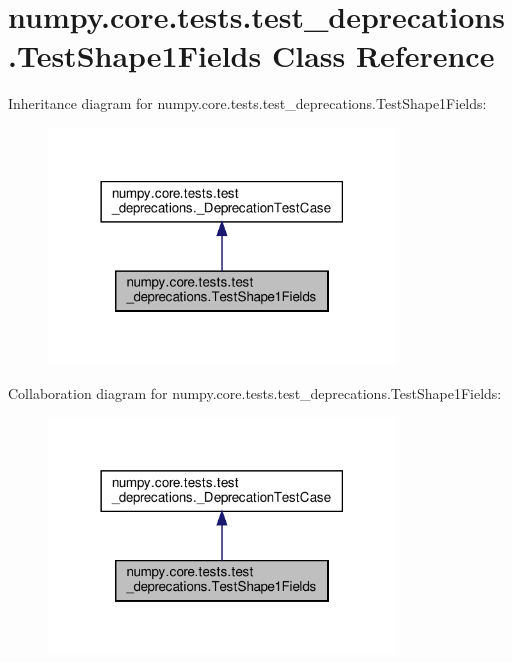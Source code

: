 \hypertarget{classnumpy_1_1core_1_1tests_1_1test__deprecations_1_1TestShape1Fields}{}\section{numpy.\+core.\+tests.\+test\+\_\+deprecations.\+Test\+Shape1\+Fields Class Reference}
\label{classnumpy_1_1core_1_1tests_1_1test__deprecations_1_1TestShape1Fields}


Inheritance diagram for numpy.\+core.\+tests.\+test\+\_\+deprecations.\+Test\+Shape1\+Fields\+:
\nopagebreak
\begin{figure}[H]
\begin{center}
\leavevmode
\includegraphics[width=261pt]{classnumpy_1_1core_1_1tests_1_1test__deprecations_1_1TestShape1Fields__inherit__graph}
\end{center}
\end{figure}


Collaboration diagram for numpy.\+core.\+tests.\+test\+\_\+deprecations.\+Test\+Shape1\+Fields\+:
\nopagebreak
\begin{figure}[H]
\begin{center}
\leavevmode
\includegraphics[width=261pt]{classnumpy_1_1core_1_1tests_1_1test__deprecations_1_1TestShape1Fields__coll__graph}
\end{center}
\end{figure}
